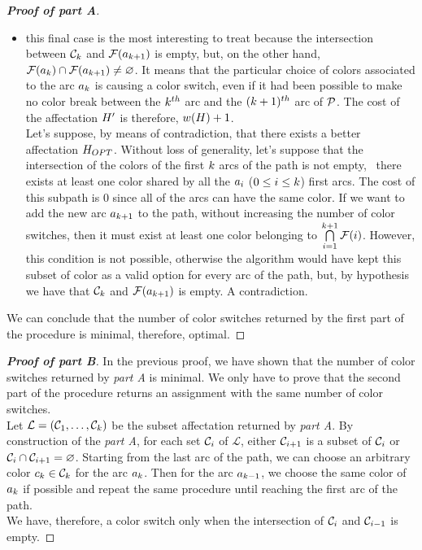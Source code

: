 \begin{proof}[\normalfont\textbf{Proof of \textit{part A}}]
\begin{itemize}
\begin{itemize}
			      \item this final case is the most interesting to treat because the intersection between $\mathcal{C}_{k}$ and $\mathcal{F}(a_{k+1})$ is empty, but, on the other hand, $\mathcal{F}(a_{k}) \cap \mathcal{F}(a_{k+1}) \neq \varnothing$. It means that the particular choice of colors associated to the arc $a_k$ is causing a color switch, even if it had been possible to make no color break between the $k^{th}$ arc and the  $(k+1)^{th}$ arc of $\mathcal{P}$. The cost of the affectation $H'$ is therefore, $w(H) + 1$.\\
			            Let's suppose, by means of contradiction, that there exists a better affectation $H_{OPT}$. Without loss of generality, let's suppose that the intersection of the colors of the first $k$ arcs of the path is not empty, \ie\ there exists at least one color shared by all the $a_i$ ($0 \leq i \leq k$) first arcs. The cost of this subpath is $0$ since all of the arcs can have the same color. If we want to add the new arc $a_{k + 1}$ to the path, without increasing the number of color switches, then it must exist at least one color belonging to $\bigcap\limits_{i = 1}^{k + 1} \mathcal{F}(i)$. However, this condition is not possible, otherwise the algorithm would have kept this subset of color as a valid option for every arc of the path, but, by hypothesis we have that $\mathcal{C}_k$ and $\mathcal{F}(a_{k + 1})$ is empty. A contradiction.
		      \end{itemize}
	\end{itemize}
	We can conclude that the number of color switches returned by the first part of the procedure is minimal, therefore, optimal.
\end{proof}

\begin{proof}[\normalfont\textbf{Proof of \textit{part B}}]
	In the previous proof, we have shown that the number of color switches returned by \textit{part A} is minimal. We only have to prove that the second part of the procedure returns an assignment with the same number of color switches.\\
	Let $\mathcal{L} = (\mathcal{C}_1,\ldots,\mathcal{C}_{k})$ be the subset affectation returned by \textit{part A}. By construction of the \textit{part A}, for each set $\mathcal{C}_i$ of $\mathcal{L}$, either $\mathcal{C}_{i+1}$ is a subset of $\mathcal{C}_i$ or $\mathcal{C}_i \cap \mathcal{C}_{i+1} = \varnothing$.
	Starting from the last arc of the path, we can choose an arbitrary color $c_k \in \mathcal{C}_k$ for the arc $a_k$. Then for the arc $a_{k-1}$, we choose the same color of $a_k$ if possible and repeat the same procedure until reaching the first arc of the path.\\
	We have, therefore, a color switch only when the intersection of $\mathcal{C}_i$ and $\mathcal{C}_{i-1}$ is empty.
\end{proof}

